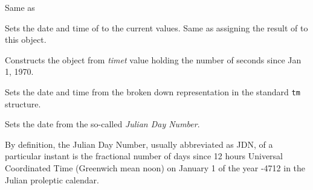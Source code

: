 \label{wxdatetimewxdatetimedate}


Same as 



\label{wxdatetimesettocurrent}


Sets the date and time of to the current values. Same as assigning the result
of  to this object.


\label{wxdatetimesettimet}


Constructs the object from {\it timet} value holding the number of seconds
since Jan 1, 1970.



\label{wxdatetimesettm}


Sets the date and time from the broken down representation in the standard
{\tt tm} structure.



\label{wxdatetimesetjdn}


Sets the date from the so-called {\it Julian Day Number}.

By definition, the Julian Day Number, usually abbreviated as JDN, of a
particular instant is the fractional number of days since 12 hours Universal
Coordinated Time (Greenwich mean noon) on January 1 of the year -4712 in the
Julian proleptic calendar.



\label{wxdatetimesettime}


